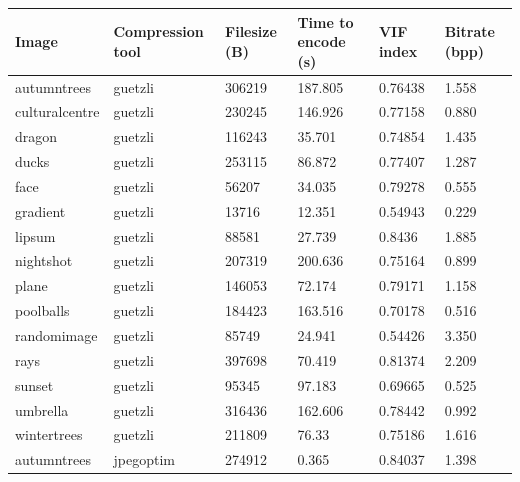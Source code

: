 \documentclass[12pt]{article}
\begin{document}
{\small
{} 
\begin{longtable}{llllll}
	\hline
	Image          & Compression tool & Filesize (B) & Time to encode (s) & VIF index & Bitrate (bpp) \\ \hline
	autumntrees    & guetzli          & 306219       & 187.805            & 0.76438   & 1.558                \\
	culturalcentre & guetzli          & 230245       & 146.926            & 0.77158   & 0.880                \\
	dragon         & guetzli          & 116243       & 35.701             & 0.74854   & 1.435                \\
	ducks          & guetzli          & 253115       & 86.872             & 0.77407   & 1.287                \\
	face           & guetzli          & 56207        & 34.035             & 0.79278   & 0.555                \\
	gradient       & guetzli          & 13716        & 12.351             & 0.54943   & 0.229                \\
	lipsum         & guetzli          & 88581        & 27.739             & 0.8436    & 1.885                \\
	nightshot      & guetzli          & 207319       & 200.636            & 0.75164   & 0.899                \\
	plane          & guetzli          & 146053       & 72.174             & 0.79171   & 1.158                \\
	poolballs      & guetzli          & 184423       & 163.516            & 0.70178   & 0.516                \\
	randomimage    & guetzli          & 85749        & 24.941             & 0.54426   & 3.350                \\
	rays           & guetzli          & 397698       & 70.419             & 0.81374   & 2.209                \\
	sunset         & guetzli          & 95345        & 97.183             & 0.69665   & 0.525                \\
	umbrella       & guetzli          & 316436       & 162.606            & 0.78442   & 0.992                \\
	wintertrees    & guetzli          & 211809       & 76.33              & 0.75186   & 1.616                \\
	autumntrees    & jpegoptim        & 274912       & 0.365              & 0.84037   & 1.398                \\

\end{longtable}}
\end{document}
